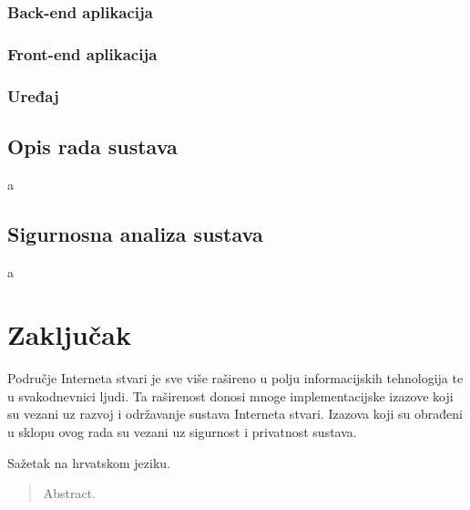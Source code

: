 \documentclass[times, utf8, diplomski]{fer}
\begin{document}
\subsection{Back-end aplikacija}
\subsection{Front-end aplikacija}
\subsection{Uređaj}

\section{Opis rada sustava}
a

\section{Sigurnosna analiza sustava}
a


\chapter{Zaključak}
Područje Interneta stvari je sve više rašireno u polju informacijskih tehnologija te u svakodnevnici ljudi. Ta raširenost donosi mnoge implementacijske izazove koji su vezani uz razvoj i održavanje sustava Interneta stvari. Izazova koji su obrađeni u sklopu ovog rada su vezani uz sigurnost i privatnost sustava.







\listoffigures
\listoftables

\begin{sazetak}
Sažetak na hrvatskom jeziku.

\end{sazetak}

\begin{abstract}
Abstract.

\end{abstract}
\end{document}
